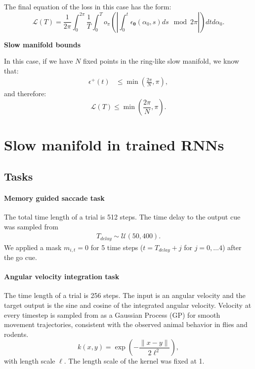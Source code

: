 \documentclass{article} %
\newcounter{ct}
\theoremstyle{definition}
\theoremstyle{remark}
\begin{document}
The final equation of the loss in this case has the form:
\begin{equation}
    \mathcal{L}(T) =  \frac{1}{2 \pi} \int_0^{2 \pi} \frac{1}{T} \int_0^T o_\pi \left( \left| \int_0^t \epsilon_{\bm{\theta}}(\alpha_0, s) ds \mod 2 \pi \right| \right) dt d\alpha_0.
\end{equation}

\textbf{Slow manifold bounds}

In this case, if we have \(N\) fixed points in the ring-like slow manifold, we know that:
\begin{equation}
\begin{split}
     \epsilon^+(t) &\leq \min \left( \frac{2 \pi}{N}, \pi \right),
\end{split}
\end{equation}
and therefore:
\begin{equation}
    \mathcal{L}(T) \leq \min \left( \frac{2 \pi}{N}, \pi \right).
\end{equation}



\newpage
\section{Slow manifold in trained RNNs}
\subsection{Tasks}\label{sec:supp:tasks}


\paragraph{Memory guided saccade task}

The total time length of a trial is 512 steps.
The time delay to the output cue was sampled from
\begin{align}
T_{delay} \sim \mathcal{U}(50, 400).
\end{align}
We applied a mask \(m_{i,t}=0\) for 5 time steps (\(t=T_{delay}+j\) for \(j=0,\dots 4\)) after the go cue.



\paragraph{Angular velocity integration task}
The time length of a trial is 256 steps.
The input is an angular velocity and the target output is the sine and cosine of the integrated angular velocity.
Velocity at every timestep  is sampled from as a Gaussian Process (GP) for smooth movement trajectories, consistent with the observed animal behavior in flies and rodents.
\begin{equation}
k(x,y)=\exp\left(-\frac{\|x-y\|}{2\ell^2}\right),
\end{equation}
with length scale \(\ell\).
 The length scale of the kernel was fixed at 1.
\end{document}
